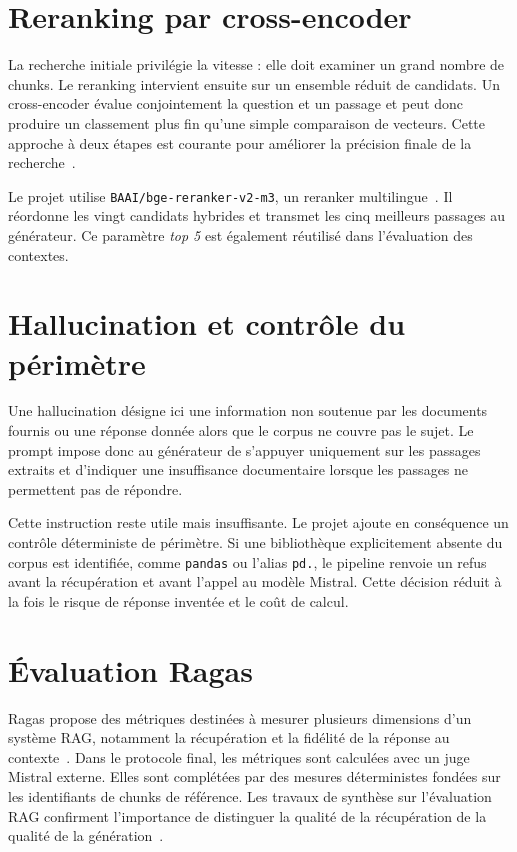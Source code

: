 \documentclass[12pt,a4paper,oneside]{report}
\begin{document}
\section{Reranking par cross-encoder}

La recherche initiale privilégie la vitesse : elle doit examiner un grand nombre
de chunks. Le reranking intervient ensuite sur un ensemble réduit de candidats.
Un cross-encoder évalue conjointement la question et un passage et peut donc
produire un classement plus fin qu'une simple comparaison de vecteurs. Cette
approche à deux étapes est courante pour améliorer la précision finale de la
recherche~\cite{nogueira2019passagererank}.

Le projet utilise \texttt{BAAI/bge-reranker-v2-m3}, un reranker multilingue~\cite{bgereranker}. Il
réordonne les vingt candidats hybrides et transmet les cinq meilleurs passages
au générateur. Ce paramètre \textit{top 5} est également réutilisé dans
l'évaluation des contextes.

\section{Hallucination et contrôle du périmètre}

Une hallucination désigne ici une information non soutenue par les documents
fournis ou une réponse donnée alors que le corpus ne couvre pas le sujet. Le
prompt impose donc au générateur de s'appuyer uniquement sur les passages
extraits et d'indiquer une insuffisance documentaire lorsque les passages ne
permettent pas de répondre.

Cette instruction reste utile mais insuffisante. Le projet ajoute en conséquence
un contrôle déterministe de périmètre. Si une bibliothèque explicitement absente
du corpus est identifiée, comme \texttt{pandas} ou l'alias \texttt{pd.}, le
pipeline renvoie un refus avant la récupération et avant l'appel au modèle
Mistral. Cette décision réduit à la fois le risque de réponse inventée et le
coût de calcul.

\section{Évaluation Ragas}

Ragas propose des métriques destinées à mesurer plusieurs dimensions d'un
système RAG, notamment la récupération et la fidélité de la réponse au
contexte~\cite{es2023ragas,ragasdocs}. Dans le protocole final, les métriques sont
calculées avec un juge Mistral externe. Elles sont complétées par des mesures
déterministes fondées sur les identifiants de chunks de référence. Les travaux de
synthèse sur l'évaluation RAG confirment l'importance de distinguer la qualité
de la récupération de la qualité de la génération~\cite{yu2024eval}.
\end{document}
